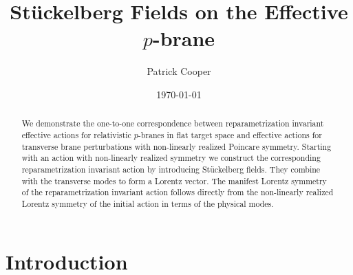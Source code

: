 \documentclass[%
 reprint,
 amsmath,amssymb,
 aps,
]{revtex4-1}
\begin{document}

\title{St\"uckelberg Fields on the Effective $p$-brane}

\author{Patrick Cooper}

\date{\today}

\begin{abstract}
We  demonstrate the one-to-one correspondence between reparametrization invariant effective actions for relativistic  $p$-branes
in flat target space and effective actions for transverse brane perturbations with non-linearly realized Poincare symmetry.
Starting with an action with non-linearly realized symmetry we construct the corresponding reparametrization invariant action by introducing
St\"uckelberg fields. They combine with the transverse modes to form a Lorentz vector. The manifest Lorentz symmetry of the reparametrization invariant action
follows directly from the non-linearly  realized Lorentz symmetry of the initial action in terms of the physical modes.
\end{abstract}

\maketitle


\section{\label{sec:level1}Introduction}
\end{document}
